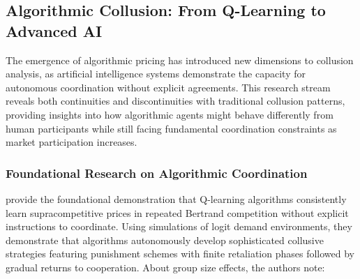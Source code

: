 %

\subsection{Algorithmic Collusion: From Q-Learning to Advanced AI}

The emergence of algorithmic pricing has introduced new dimensions to collusion analysis, as artificial intelligence systems demonstrate the capacity for autonomous coordination without explicit agreements. This research stream reveals both continuities and discontinuities with traditional collusion patterns, providing insights into how algorithmic agents might behave differently from human participants while still facing fundamental coordination constraints as market participation increases.

\subsubsection*{Foundational Research on Algorithmic Coordination}

\textcite{calvano_artificial_2020} provide the foundational demonstration that Q-learning algorithms consistently learn supracompetitive prices in repeated Bertrand competition without explicit instructions to coordinate. Using simulations of logit demand environments, they demonstrate that algorithms autonomously develop sophisticated collusive strategies featuring punishment schemes with finite retaliation phases followed by gradual returns to cooperation. About group size effects, the authors \parencite*[p. 3268]{calvano_artificial_2020} note: 

